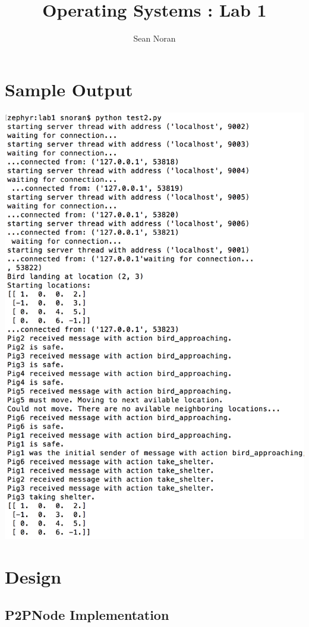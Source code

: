 \documentclass[]{article}
\title{Operating Systems : Lab 1}
\author{Sean Noran}
\begin{document}
\maketitle

\onehalfspacing

\section{Sample Output}

\includegraphics[scale=0.5]{output}

\section{Design}

\subsection{P2PNode Implementation}
\end{document}
